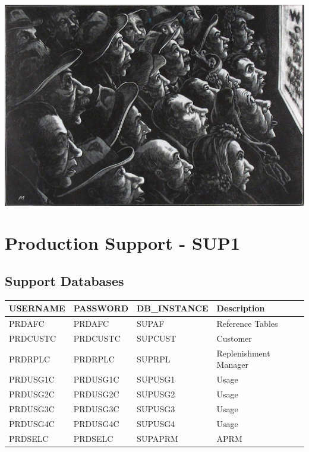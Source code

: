 \documentclass[12pt,twoside]{article}
\begin{document}
\normalsize
\vspace{45mm}
    \includegraphics[width=17cm]{Pictures/Meissner_War_Bulletins.jpg}
\newpage
\section{Production Support - SUP1}
\label{sec-10}
\subsection{Support Databases}
\label{sec-10-1}

\scriptsize

\begin{center}
\begin{tabular}{llll}
\hline
 \textbf{USERNAME}  &  \textbf{PASSWORD}  &  \textbf{DB\_INSTANCE}  &  \textbf{Description}   \\
\hline
 PRDAFC             &  PRDAFC             &  SUPAF                  &  Reference Tables       \\
 PRDCUSTC           &  PRDCUSTC           &  SUPCUST                &  Customer               \\
 PRDRPLC            &  PRDRPLC            &  SUPRPL                 &  Replenishment Manager  \\
 PRDUSG1C           &  PRDUSG1C           &  SUPUSG1                &  Usage                  \\
 PRDUSG2C           &  PRDUSG2C           &  SUPUSG2                &  Usage                  \\
 PRDUSG3C           &  PRDUSG3C           &  SUPUSG3                &  Usage                  \\
 PRDUSG4C           &  PRDUSG4C           &  SUPUSG4                &  Usage                  \\
 PRDSELC            &  PRDSELC            &  SUPAPRM                &  APRM                   \\
\hline
\end{tabular}
\end{center}
\end{document}
